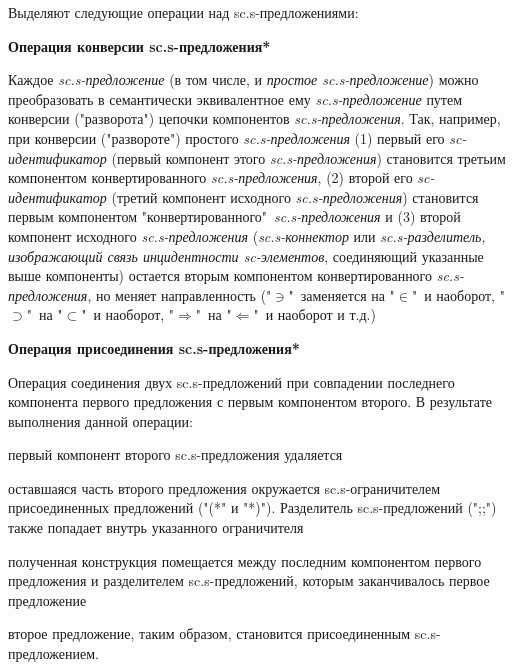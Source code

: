 Выделяют следующие операции над sc.s-предложениями:
\
\begin{textitemize}
	\item{\textbf{Операция конверсии sc.s-предложения*}
	
		Каждое \textit{sc.s-предложение} (в том числе, и \textit{простое sc.s-предложение}) можно преобразовать в семантически эквивалентное ему \textit{sc.s-предложение} путем конверсии ("разворота"{}) цепочки компонентов \textit{sc.s-предложения}. Так, например, при конверсии ("развороте") простого \textit{\mbox{sc.s-предложения}} (1) первый его \textit{\mbox{sc-идентификатор}} (первый компонент этого \textit{\mbox{sc.s-предложения}}) становится третьим компонентом конвертированного\textit{ \mbox{sc.s-предложения}}, (2) второй его \textit{\mbox{sc-идентификатор}} (третий компонент исходного \textit{\mbox{sc.s-предложения}}) становится первым компонентом "конвертированного"\ \textit{\mbox{sc.s-предложения}} и (3) второй компонент исходного \textit{\mbox{sc.s-предложения}} (\textit{\mbox{sc.s-коннектор}} или \textit{\mbox{sc.s-разделитель}, изображающий связь инцидентности \mbox{sc-элементов}}, соединяющий указанные выше компоненты) остается вторым компонентом конвертированного \textit{\mbox{sc.s-предложения}}, но меняет направленность ("$\ni$"\ заменяется на "$\in$"\ и наоборот, "$\supset$"\ на "$\subset$"\ и наоборот, "$\Rightarrow$"\ на "$\Leftarrow$"\ и наоборот и т.д.)}
	
	\item{\textbf{Операция присоединения sc.s-предложения*}
		
		Операция соединения двух sc.s-предложений при совпадении последнего компонента первого предложения с первым компонентом второго.
		В результате выполнения данной операции:
		\begin{textitemize}
			\item первый компонент второго sc.s-предложения удаляется
			\item оставшаяся часть второго предложения окружается sc.s-ограничителем присоединенных предложений ("(*"{} и "*)"{}). Разделитель sc.s-предложений (";;"{}) также попадает внутрь указанного ограничителя
			\item полученная конструкция помещается между последним компонентом первого предложения и разделителем sc.s-предложений, которым заканчивалось первое предложение\char59
			\item второе предложение, таким образом, становится присоединенным sc.s-предложением.
		\end{textitemize}
	
}
\end{textitemize}
